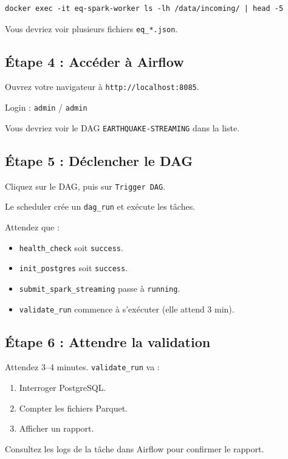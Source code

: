 \documentclass[12pt, a4paper]{article}
\begin{document}
\begin{lstlisting}
docker exec -it eq-spark-worker ls -lh /data/incoming/ | head -5
\end{lstlisting}

Vous devriez voir plusieurs fichiers \texttt{eq\_*.json}.

\subsection{Étape 4 : Accéder à Airflow}

Ouvrez votre navigateur à \texttt{http://localhost:8085}.

Login : \texttt{admin} / \texttt{admin}

Vous devriez voir le DAG \texttt{EARTHQUAKE-STREAMING} dans la liste.

\subsection{Étape 5 : Déclencher le DAG}

Cliquez sur le DAG, puis sur \texttt{Trigger DAG}.

Le scheduler crée un \texttt{dag\_run} et exécute les tâches.

Attendez que :
\begin{itemize}
  \item \texttt{health\_check} soit \texttt{success}.
  \item \texttt{init\_postgres} soit \texttt{success}.
  \item \texttt{submit\_spark\_streaming} passe à \texttt{running}.
  \item \texttt{validate\_run} commence à s'exécuter (elle attend 3 min).
\end{itemize}

\subsection{Étape 6 : Attendre la validation}

Attendez 3--4 minutes. \texttt{validate\_run} va :
\begin{enumerate}
  \item Interroger PostgreSQL.
  \item Compter les fichiers Parquet.
  \item Afficher un rapport.
\end{enumerate}

Consultez les logs de la tâche dans Airflow pour confirmer le rapport.
\end{document}

